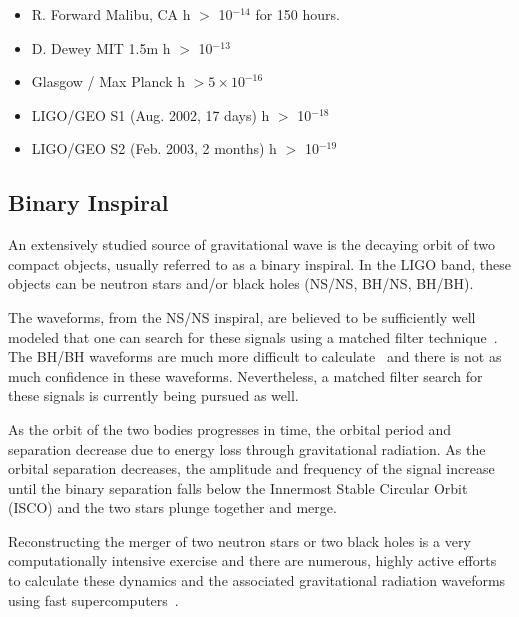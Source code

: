 \begin{itemize}

\item R. Forward \qquad Malibu, CA    \quad h $>$ 10$^{-14}$ for 150 hours.

\item D. Dewey   \qquad MIT 1.5m  \quad h $>$ 10$^{-13}$ 

\item Glasgow / Max Planck \qquad {} \quad h $> 5 \times 10^{-16}$

\item LIGO/GEO S1 (Aug. 2002, 17 days) \quad  h $>$ 10$^{-18}$

\item LIGO/GEO S2 (Feb. 2003, 2 months) \quad  h $>$ 10$^{-19}$

\end{itemize}


\subsection{Binary Inspiral}

An extensively studied source of gravitational wave is the decaying orbit of
two compact objects, usually referred to as a binary inspiral. In the LIGO band,
these objects can be neutron stars and/or black holes (NS/NS, BH/NS, BH/BH).

The waveforms, from the NS/NS inspiral,
are believed to be sufficiently well modeled that one can search for these 
signals using a matched filter technique~\cite{Bruce:chisquare}. The BH/BH waveforms 
are much more difficult to calculate~\cite{BCV1} and there is not as much 
confidence in these waveforms. Nevertheless, a matched filter search for these 
signals is currently being pursued as well.

As the
orbit of the two bodies progresses in time, the orbital period and separation
decrease due to energy loss through gravitational radiation. As the orbital 
separation decreases, the amplitude and frequency of the signal increase until
the binary separation falls below the Innermost Stable Circular Orbit (ISCO)
and the two stars plunge together and merge.

Reconstructing the merger of two neutron stars or two black holes is a very
computationally intensive exercise and there are numerous, highly active
efforts to calculate these dynamics and the associated gravitational radiation
waveforms using fast supercomputers~\cite{Jorge:Numerical}.

